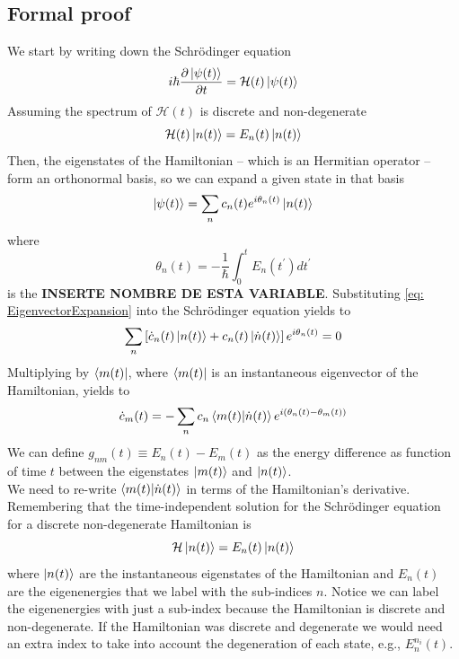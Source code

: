 \subsection{Formal proof}
We start by writing down the Schrödinger equation
\begin{equation}
    i\hbar \frac{\partial \ket{\psi(t)}}{\partial t} = \mathcal{H}(t)\ket{\psi(t)}
\end{equation}
Assuming the spectrum of $\mathcal{H}(t)$ is discrete and non-degenerate
\begin{equation}
\label{eq:Hamiltonian}
    \mathcal{H}(t) \ket{n(t)} = E_{n}(t)\ket{n(t)}
\end{equation}
Then, the eigenstates of the Hamiltonian -- which is an Hermitian operator -- form an orthonormal basis, so we can expand a given state in that basis
\begin{equation}
\label{eq: EigenvectorExpansion}
    \ket{\psi(t)} = \sum_{n}c_{n}(t)e^{i\theta_{n}(t)} \ket{n(t)}
\end{equation}
where
\begin{equation}
    \theta_{n}(t) = -\frac{1}{\hbar}\int_{0}^{t}E_{n}(t^{\prime})dt^{\prime}
\end{equation}
is the \textbf{INSERTE NOMBRE DE ESTA VARIABLE}.
Substituting \ref{eq: EigenvectorExpansion} into the Schrödinger equation yields to
\begin{equation}
    \sum_{n}\left[\dot{c}_{n}(t)\ket{n(t)} + c_{n}(t)\ket{\dot{n}(t)}\right]e^{i\theta_{n}(t)} = 0
\end{equation}
Multiplying by $\bra{m(t)}$, where $\bra{m(t)}$ is an instantaneous eigenvector of the Hamiltonian, yields to
\begin{equation}
\label{eq:Coefficients}
    \dot{c}_{m}(t) = - \sum_{n}c_{n}\braket{m(t)|\dot{n}(t)}e^{i\left(\theta_{n}(t) - \theta_{m}(t)\right)}
\end{equation}
We can define $g_{nm}(t)\equiv E_{n}(t) - E_{m}(t)$ as the energy difference as function of time $t$ between the eigenstates $\ket{m(t)}$ and $\ket{n(t)}$.\\
We need to re-write $\braket{m(t)|\dot{n}(t)}$ in terms of the Hamiltonian's derivative. Remembering that the time-independent solution for the Schrödinger equation for a discrete non-degenerate Hamiltonian is
\begin{equation}
    \mathcal{H}\ket{n(t)} = E_{n}(t)\ket{n(t)}
\end{equation}
where $\ket{n(t)}$ are the instantaneous eigenstates of the Hamiltonian and $E_{n}(t)$ are the eigenenergies that we label with the sub-indices $n$. Notice we can label the eigenenergies with just a sub-index because the Hamiltonian is discrete and non-degenerate. If the Hamiltonian was discrete and degenerate we would need an extra index to take into account the degeneration of each state, e.g., $E_{n}^{n_{i}}(t)$.\\
